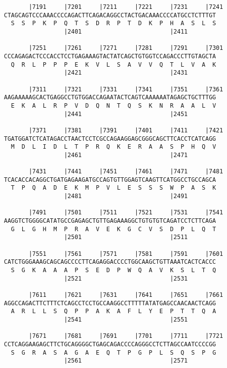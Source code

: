 \documentclass{article}
\begin{document}
\begin{Verbatim}
       |7191     |7201     |7211     |7221     |7231     |7241
CTAGCAGTCCCAAACCCCAGACTTCAGACAGGCCTACTGACAAACCCCATGCCTCTTTGT
  S  S  P  K  P  Q  T  S  D  R  P  T  D  K  P  H  A  S  L  S
                 |2401                         |2411        
  
       |7251     |7261     |7271     |7281     |7291     |7301
CCCAGAGACTCCCACCTCCTGAGAAAGTACTATCAGCTGTGGTCCAGACCCTTGTAGCTA
  Q  R  L  P  P  P  E  K  V  L  S  A  V  V  Q  T  L  V  A  K
                 |2421                         |2431        
  
       |7311     |7321     |7331     |7341     |7351     |7361
AAGAAAAAGCACTGAGGCCTGTGGACCAGAATACTCAGTCAAAAAATAGAGCTGCTTTGG
  E  K  A  L  R  P  V  D  Q  N  T  Q  S  K  N  R  A  A  L  V
                 |2441                         |2451        
  
       |7371     |7381     |7391     |7401     |7411     |7421
TGATGGATCTCATAGACCTAACTCCTCGCCAGAAGGAGCGGGCAGCTTCACCTCATCAGG
  M  D  L  I  D  L  T  P  R  Q  K  E  R  A  A  S  P  H  Q  V
                 |2461                         |2471        
  
       |7431     |7441     |7451     |7461     |7471     |7481
TCACACCACAGGCTGATGAGAAGATGCCAGTGTTGGAGTCAAGTTCATGGCCTGCCAGCA
  T  P  Q  A  D  E  K  M  P  V  L  E  S  S  S  W  P  A  S  K
                 |2481                         |2491        
  
       |7491     |7501     |7511     |7521     |7531     |7541
AAGGTCTGGGGCATATGCCGAGAGCTGTTGAGAAAGGCTGTGTGTCAGATCCTCTTCAGA
  G  L  G  H  M  P  R  A  V  E  K  G  C  V  S  D  P  L  Q  T
                 |2501                         |2511        
  
       |7551     |7561     |7571     |7581     |7591     |7601
CATCTGGGAAAGCAGCAGCCCCTTCAGAGGACCCCTGGCAAGCTGTTAAATCACTCACCC
  S  G  K  A  A  A  P  S  E  D  P  W  Q  A  V  K  S  L  T  Q
                 |2521                         |2531        
  
       |7611     |7621     |7631     |7641     |7651     |7661
AGGCCAGACTTCTTTCTCAGCCTCCTGCCAAGGCCTTTTTATATGAGCCAACAACTCAGG
  A  R  L  L  S  Q  P  P  A  K  A  F  L  Y  E  P  T  T  Q  A
                 |2541                         |2551        
  
       |7671     |7681     |7691     |7701     |7711     |7721
CCTCAGGAAGAGCTTCTGCAGGGGCTGAGCAGACCCCAGGGCCTCTTAGCCAATCCCCGG
  S  G  R  A  S  A  G  A  E  Q  T  P  G  P  L  S  Q  S  P  G
                 |2561                         |2571        
  

\end{Verbatim}
\end{document}
